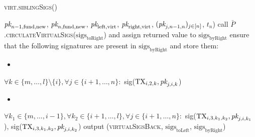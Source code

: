 \begin{center}
\begin{processbox}{\textsc{virt.siblingSigs}()}
\begin{algorithmic}[1]
        $\textit{pk}_{n-1, \mathrm{fund}, \mathrm{new}}$, $\textit{pk}_{n, \mathrm{fund},
        \mathrm{new}}$, $\textit{pk}_{\mathrm{left}, \mathrm{virt}}$,
        $\textit{pk}_{\mathrm{right}, \mathrm{virt}}$, $(\textit{pk}_{j, n-1, n})_{j \in [n]}$,
        $t_n$)
      \EndIf
      \Statex
      \State call
      $\bar{P}$.\textsc{circulateVirtualSigs}($\mathrm{sigs}_{\mathrm{toRight}}$)
      and assign returned value to $\mathrm{sigs}_{\mathrm{byRight}}$
      \State ensure that the following signatures are present in
      $\mathrm{sigs}_{\mathrm{byRight}}$ and store them:
      \begin{itemize}
        \item {}
      \end{itemize}
      \Indent
        \State $\forall k \in \{m, \dots, l\} \setminus \{i\}, \forall j \in
        \{i+1, \dots, n\}:$
        \Indent
          \State sig($\mathrm{TX}_{i, 2, k}, \textit{pk}_{j, i, k}$)
        \EndIndent
      \EndIndent
      \begin{itemize}
        \item {}
      \end{itemize}
      \Indent
        \State $\forall k_1 \in \{m, \dots, i-1\}, \forall k_2 \in \{i+1, \dots,
        l\}, \forall j \in \{i+1, \dots, n\}:$
        \Indent
          \State sig($\mathrm{TX}_{i, 3, k_1, k_2}, \textit{pk}_{j, i, k_1}$),
          sig($\mathrm{TX}_{i, 3, k_1, k_2}, \textit{pk}_{j, i, k_2}$)
        \EndIndent
      \EndIndent
      \State output (\textsc{virtualSigsBack},
      $\mathrm{sigs}_{\mathrm{toLeft}}$, $\mathrm{sigs}_{\mathrm{byRight}}$)
    \end{algorithmic}
  \end{processbox}
  \label{code:virtual-layer:sibling-sigs}
\end{center} \ \\

